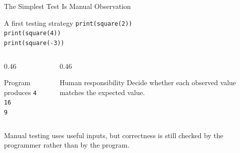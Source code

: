 \documentclass[aspectratio=169,10pt]{beamer}
\begin{document}
\begin{frame}{The Simplest Test Is Manual Observation}
  \begin{block}{A first testing strategy}
    \texttt{print(square(2))}\\
    \texttt{print(square(4))}\\
    \texttt{print(square(-3))}
  \end{block}

  \begin{columns}[T,onlytextwidth]
    \begin{column}{0.46\textwidth}
      \begin{block}{Program produces}
        \texttt{4}\\
        \texttt{16}\\
        \texttt{9}
      \end{block}
    \end{column}

    \begin{column}{0.46\textwidth}
      \begin{block}{Human responsibility}
        Decide whether each observed value matches the expected value.
      \end{block}
    \end{column}
  \end{columns}

  \begin{keyidea}
    Manual testing uses useful inputs, but correctness is still checked by the programmer rather than by the program.
  \end{keyidea}
\end{frame}
\end{document}
